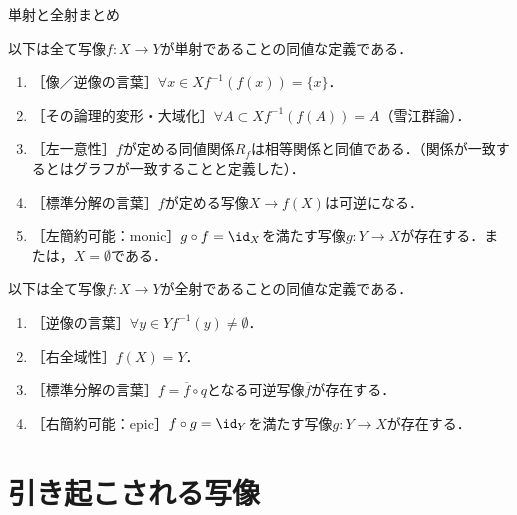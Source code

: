 \documentclass[uplatex,dvipdfmx]{jsreport}
\begin{document}
\begin{itembox}[l]{単射と全射まとめ}
    \begin{theorem}[mono]\label{thm-mono}
        以下は全て写像$f:X\to Y$が単射であることの同値な定義である．
        \begin{enumerate}
            \item ［像／逆像の言葉］$\forall x\in X f^{-1}(f(x))=\{x\}$．
            \item ［その論理的変形・大域化］$\forall A\subset X f^{-1}(f(A))=A$（雪江群論）．
            \item ［左一意性］$f$が定める同値関係$R_f$は相等関係と同値である．（関係が一致するとはグラフが一致することと定義した）．
            \item ［標準分解の言葉］$f$が定める写像$X\to f(X)$は可逆になる．
            \item ［左簡約可能：monic］$g\circ f=\id_X$を満たす写像$g:Y\to X$が存在する．または，$X=\emptyset$である．
        \end{enumerate}
    \end{theorem}
    \begin{theorem}[epi]\label{thm-epi}
        以下は全て写像$f:X\to Y$が全射であることの同値な定義である．
        \begin{enumerate}
            \item ［逆像の言葉］$\forall y\in Y f^{-1}(y)\ne\emptyset$．
            \item ［右全域性］$f(X)=Y$．
            \item ［標準分解の言葉］$f=\overline{f}\circ q$となる可逆写像$\overline{f}$が存在する．
            \item ［右簡約可能：epic］$f\circ g=\id_Y$を満たす写像$g:Y\to X$が存在する．
        \end{enumerate}
    \end{theorem}
\end{itembox}

\section{引き起こされる写像}
\end{document}
